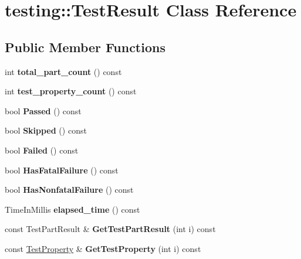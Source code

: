 \hypertarget{classtesting_1_1_test_result}{}\section{testing\+:\+:Test\+Result Class Reference}
\label{classtesting_1_1_test_result}
\subsection*{Public Member Functions}
\begin{DoxyCompactItemize}
\item 
\mbox{\label{classtesting_1_1_test_result_a6174aa4019dcda7c34d776b5741c9032}} 
int {\bfseries total\+\_\+part\+\_\+count} () const
\item 
\mbox{\label{classtesting_1_1_test_result_afe4523257bbea8bc63b0950b702790be}} 
int {\bfseries test\+\_\+property\+\_\+count} () const
\item 
\mbox{\label{classtesting_1_1_test_result_acf7e6e72f05a0545c48ea48e7f8851df}} 
bool {\bfseries Passed} () const
\item 
\mbox{\label{classtesting_1_1_test_result_a4c9e954e0f8c1386206f2e6208c45244}} 
bool {\bfseries Skipped} () const
\item 
\mbox{\label{classtesting_1_1_test_result_afacc37e8b43c8574e4101bc61723c769}} 
bool {\bfseries Failed} () const
\item 
\mbox{\label{classtesting_1_1_test_result_a30e00d4076ae07fb5ad7b623d9dc1fe4}} 
bool {\bfseries Has\+Fatal\+Failure} () const
\item 
\mbox{\label{classtesting_1_1_test_result_a510564fa67b485ed4589a259f2a032d6}} 
bool {\bfseries Has\+Nonfatal\+Failure} () const
\item 
\mbox{\label{classtesting_1_1_test_result_a717e05e00d4af5cb809433e343ab63af}} 
Time\+In\+Millis {\bfseries elapsed\+\_\+time} () const
\item 
\mbox{\label{classtesting_1_1_test_result_a765c1e734ac08115757b343d57226bba}} 
const Test\+Part\+Result \& {\bfseries Get\+Test\+Part\+Result} (int i) const
\item 
\mbox{\label{classtesting_1_1_test_result_a6c2f478dbce36b57d18bedded46d70af}} 
const \mbox{\hyperlink{classtesting_1_1_test_property}{Test\+Property}} \& {\bfseries Get\+Test\+Property} (int i) const
\end{DoxyCompactItemize}
